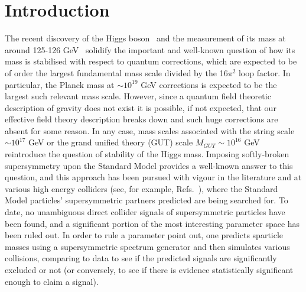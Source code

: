 \documentclass[final,3p,times,pdflatex]{elsarticle}
\begin{document}
\section{Introduction}

The recent discovery of the Higgs boson~\cite{Aad:2012tfa,Chatrchyan:2012ufa}
and the measurement of its mass at around 
125-126 GeV~\cite{ATLAS-CONF-2013-014} solidify the important and well-known
question of how its mass is 
stabilised with respect to quantum corrections, which are expected to be of
order the largest fundamental mass scale divided by the 16$\pi^2$ loop factor.
In particular, the Planck mass at $\sim 10^{19}$ GeV 
corrections is expected to be the largest such relevant mass scale. 
However, since a quantum field theoretic description of gravity does not
exist it is possible, if not expected, that our effective field theory
description breaks down and such huge corrections are absent
for some reason. 
In any case, mass scales associated with the string scale $\sim 10^{17}$ GeV
or the grand unified theory (GUT) scale $M_{GUT}\sim 10^{16}$ GeV reintroduce
the question of stability of 
the Higgs mass.  
Imposing softly-broken supersymmetry upon the Standard Model provides a
well-known answer to this question, and this approach has been pursued
with vigour in the literature and at various high energy colliders (see, for
example, Refs.~\cite{Aad:2013wta,Chatrchyan:2014lfa}), where 
the Standard Model particles' supersymmetric partners predicted are being
searched for. To date, no unambiguous direct collider signals of
supersymmetric particles have been found, and a significant portion of the
most interesting parameter space has been ruled out. 
In order to rule a parameter point out, one predicts sparticle masses using
a supersymmetric spectrum generator and then simulates various collisions,
comparing to data to see if the predicted signals are significantly excluded
or not (or conversely, to see if there is evidence statistically significant
enough to claim a signal).
\end{document}

